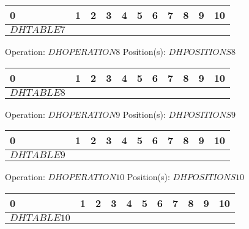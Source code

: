 {{\begin{center}
\begin{tabular}{|P{0.75cm}|P{0.75cm}|P{0.75cm}|P{0.75cm}|P{0.75cm}|P{0.75cm}|P{0.75cm}|P{0.75cm}|P{0.75cm}|P{0.75cm}|P{0.75cm}|}
                 & 1 & 2 & 3 & 4 & 5 & 6 & 7 & 8 & 9 & 10  \\
                \hline
                $DHTABLE7$&&&&&&&&&& \\
                \hline
            \end{tabular}
        \end{center}Operation: \underline{\color{tumgadRed}$DHOPERATION8$} \hspace{10px} Position(s): \underline{\color{tumgadRed}$DHPOSITIONS8$}
        \begin{center}
            \begin{tabular}{|P{0.75cm}|P{0.75cm}|P{0.75cm}|P{0.75cm}|P{0.75cm}|P{0.75cm}|P{0.75cm}|P{0.75cm}|P{0.75cm}|P{0.75cm}|P{0.75cm}|}
                 & 1 & 2 & 3 & 4 & 5 & 6 & 7 & 8 & 9 & 10  \\
                \hline
                $DHTABLE8$&&&&&&&&&& \\
                \hline
            \end{tabular}
        \end{center}Operation: \underline{\color{tumgadRed}$DHOPERATION9$} \hspace{10px} Position(s): \underline{\color{tumgadRed}$DHPOSITIONS9$}
        \begin{center}
            \begin{tabular}{|P{0.75cm}|P{0.75cm}|P{0.75cm}|P{0.75cm}|P{0.75cm}|P{0.75cm}|P{0.75cm}|P{0.75cm}|P{0.75cm}|P{0.75cm}|P{0.75cm}|}
                 & 1 & 2 & 3 & 4 & 5 & 6 & 7 & 8 & 9 & 10  \\
                \hline
                $DHTABLE9$&&&&&&&&&& \\
                \hline
            \end{tabular}
        \end{center}Operation: \underline{\color{tumgadRed}$DHOPERATION10$} \hspace{10px} Position(s): \underline{\color{tumgadRed}$DHPOSITIONS10$}
        \begin{center}
            \begin{tabular}{|P{0.75cm}|P{0.75cm}|P{0.75cm}|P{0.75cm}|P{0.75cm}|P{0.75cm}|P{0.75cm}|P{0.75cm}|P{0.75cm}|P{0.75cm}|P{0.75cm}|}
                 & 1 & 2 & 3 & 4 & 5 & 6 & 7 & 8 & 9 & 10  \\
                \hline
                $DHTABLE10$&&&&&&&&&& \\
                \hline
            \end{tabular}
        \end{center}
    }
}
